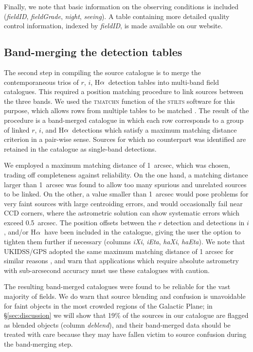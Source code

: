 \documentclass[useAMS,usenatbib]{mn2e}
\def\ha{\mbox{H$\rm \alpha$}}
\begin{document}
Finally, we note that basic information on the observing conditions
is included (\emph{fieldID}, \emph{fieldGrade}, \emph{night}, \emph{seeing}).
A table containing more detailed quality control information,
indexed by \emph{fieldID}, is made available on our website.

\subsection{Band-merging the detection tables}

The second step in compiling the source catalogue
is to merge the contemporaneous trios
of $r$, $i$, \ha\ detection tables
into multi-band field catalogues.
This required a position matching procedure 
to link sources between the three bands.
We used the \textsc{tmatchn} function 
of the \textsc{stilts} software for this purpose,
which allows rows from multiple tables to be matched \citep{Taylor2006}.
The result of the procedure is a band-merged catalogue
in which each row corresponds to a group of linked $r$, $i$, and \ha\ detections
which satisfy a maximum matching distance criterion in a pair-wise sense.
Sources for which no counterpart was identified
are retained in the catalogue as single-band detections.

We employed a maximum matching distance of 1~arcsec,
which was chosen, trading off completeness against reliability.
On the one hand, a matching distance larger than 1~arcsec 
was found to allow too many spurious and unrelated sources 
to be linked. 
On the other, a value smaller than 1~arcsec 
would pose problems for very faint sources 
with large centroiding errors, 
and would occasionally fail near CCD corners,
where the astrometric solution can 
show systematic errors which exceed 0.5~arcsec.
The position offsets between the $r$ detection and detections in $i$, and/or \ha\
have been included in the catalogue, giving the user the option to tighten them 
further if necessary
(columns \emph{iXi}, \emph{iEta}, \emph{haXi}, \emph{haEta}).
We note that UKIDSS/GPS adopted 
the same maximum matching distance of 1 arcsec
for similar reasons \citep{Hambly2008},
and warn that applications which require absolute
astrometry with sub-arcsecond accuracy must
use these catalogues with caution.

The resulting band-merged catalogues were found
to be reliable for the vast majority of fields.
We do warn that source blending and confusion is unavoidable
for faint objects in the most crowded regions of the Galactic Plane;
in \S\ref{sec:discussion} we will show
that 19\% of the sources in our catalogue
are flagged as blended objects (column \emph{deblend}),
and their band-merged data should be treated with care
because they may have fallen victim to source confusion
during the band-merging step.
\end{document}
